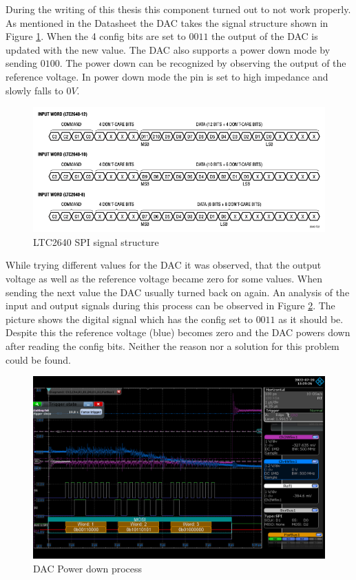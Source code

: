 During the writing of this thesis this component turned out to not work properly. As mentioned in the Datasheet the DAC takes the signal structure shown in Figure \ref{fig:meas:circ:dac_spi}. When the 4 config bits are set to $0011$ the output of the DAC is updated with the new value. The DAC also supports a power down mode by sending $0100$. The power down can be recognized by observing the output of the reference voltage. In power down mode the pin is set to high impedance and slowly falls to $0V$.\cite{linear_technology_ltc2640_2017}
%
\begin{figure}
  \centering
  \includegraphics[width=\textwidth]{src/assets/pictures/measurements/dac_bit_structure.png}
  \caption{LTC2640 SPI signal structure\cite{linear_technology_ltc2640_2017}}\label{fig:meas:circ:dac_spi}
\end{figure}
\p
While trying different values for the DAC it was observed, that the output voltage as well as the reference voltage became zero for some values. When sending the next value the DAC usually turned back on again. An analysis of the input and output signals during this process can be observed in Figure \ref{fig:meas:circ:dac_power_down}.\p
The picture shows the digital signal which has the config set to $0011$ as it should be. Despite this the reference voltage (blue) becomes zero and the DAC powers down after reading the config bits. Neither the reason nor a solution for this problem could be found.
%
\begin{figure}
  \centering
  \includegraphics[height=\largeheight]{src/assets/pictures/measurements/dac_power_down.png}
  \caption{DAC Power down process}\label{fig:meas:circ:dac_power_down}
\end{figure}